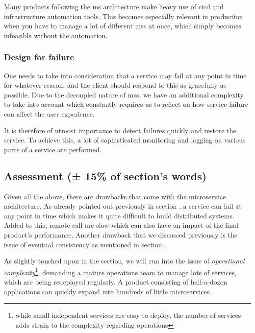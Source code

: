 Many products following the \gls{ms} architecture make heavy use of
\gls{cicd} and infrastructure automation tools. This becomes
especially relevant in production when you have to manage a lot of
different \glspl{ms} at once, which simply becomes infeasible without
the automation.

\subsubsection{Design for failure}
\label{sec:design-for-failure}

One needs to take into consideration that a service may fail at any
point in time for whatever reason, and the client should respond to
this as gracefully as possible. Due to the decoupled nature of
\glspl{ms}, we have an additional complexity to take into account
which constantly requires us to reflect on how service failure can
affect the user experience.

It is therefore of utmost importance to detect failures quickly and
restore the service. To achieve this, a lot of sophisticated
monitoring and logging on various parts of a service are performed.


\subsection{Assessment (± 15\% of section's words)}

Given all the above, there are drawbacks that come with the
microservice architecture. As already pointed out previously in
section , a service can fail at any point
in time which makes it quite difficult to build distributed systems.
Added to this, remote call are slow which can also have an impact of
the final product's performance. Another drawback that we discussed
previously is the issue of eventual consistency as mentioned in section
.

As slightly touched upon in the
 section, we will run into the
issue of \textit{operational complexity}\footnote{while small
	independent services are easy to deploy, the number of services adds
strain to the complexity regarding operations}, demanding a mature
operations team to manage lots of services, which are being redeployed
regularly. A product consisting of half-a-dozen applications can
quickly expand into hundreds of little microservices.
\cite{ms-trade-off}

